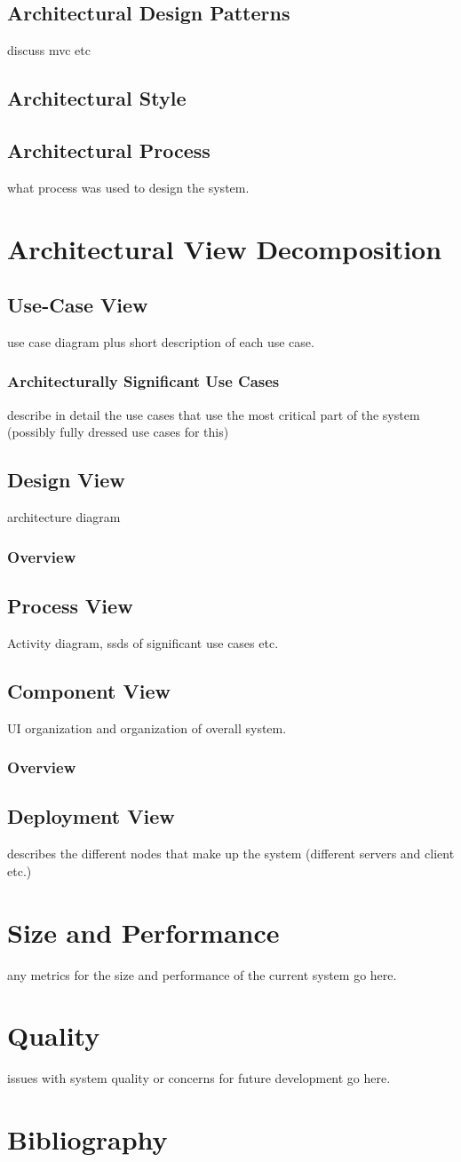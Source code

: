 \documentclass[11pt]{article}
\begin{document}
\subsection{Architectural Design Patterns}
discuss mvc etc
\subsection{Architectural Style}
\subsection{Architectural Process}
what process was used to design the system.
\section{Architectural View Decomposition}
\subsection{Use-Case View}
use case diagram plus short description of each use case.
\subsubsection{Architecturally Significant Use Cases}
describe in detail the use cases that use the most critical part of the system (possibly fully dressed use cases for this)
\subsection{Design View}
architecture diagram
\subsubsection{Overview}
\subsection{Process View}
Activity diagram, ssds of significant use cases etc.
\subsection{Component View}
UI organization and organization of overall system.
\subsubsection{Overview}
\subsection{Deployment View}
describes the different nodes that make up the system (different servers and client etc.)
\section{Size and Performance}
any metrics for the size and performance of the current system go here.
\section{Quality}
issues with system quality or concerns for future development go here.
\section{Bibliography}
\end{document}
